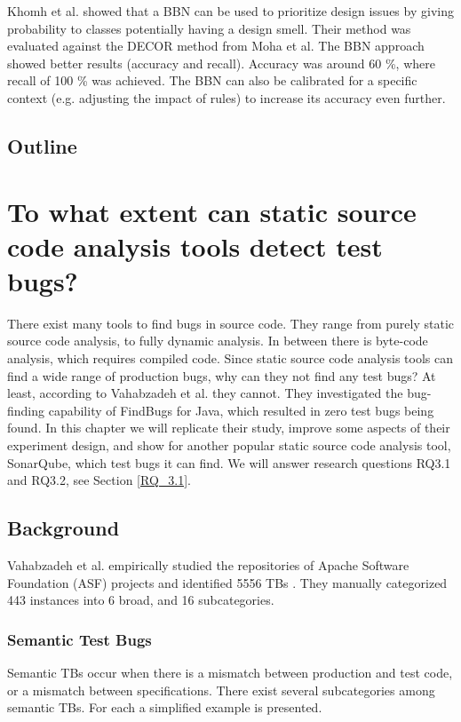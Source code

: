 \documentclass{uvamscse}
\newcommand{\Atestbugs}{Vahabzadeh et al.}
\begin{document}
Khomh et al. showed that a BBN can be used to prioritize design issues by giving probability to classes potentially having a design smell. Their method was evaluated against the DECOR method from Moha et al.\cite{moha2010domain} The BBN approach showed better results (accuracy and recall). Accuracy was around 60 \%, where recall of 100 \% was achieved. The BBN can also be calibrated for a specific context (e.g. adjusting the impact of rules) to increase its accuracy even further. \\



\section{Outline}


\chapter{To what extent can static source code analysis tools detect test bugs?}
\label{ch:SQ}
There exist many tools to find bugs in source code. They range from purely static source code analysis, to fully dynamic analysis. In between there is byte-code analysis, which requires compiled code. Since static source code analysis tools can find a wide range of production bugs, why can they not find any test bugs? At least, according to \Atestbugs{} they cannot. They investigated the bug-finding capability of FindBugs for Java, which resulted in zero test bugs being found\cite{vahabzadeh2015empirical}.  In this chapter we will replicate their study, improve some aspects of their experiment design, and show for another popular static source code analysis tool, SonarQube, which test bugs it can find. We will answer research questions RQ3.1 and RQ3.2, see Section \ref{RQ_3.1}.

\section{Background}
\label{sec:background}

\Atestbugs{} empirically studied the repositories of Apache Software Foundation (ASF) projects and identified 5556 TBs \cite{vahabzadeh2015empirical}. They manually categorized 443 instances into 6 broad, and 16 subcategories. 

\subsection{Semantic Test Bugs}
\label{sec:semanticTB}
Semantic TBs occur when there is a mismatch between production and test code, or a mismatch between specifications. There exist several subcategories among semantic TBs. For each a simplified example is presented.
\end{document}
